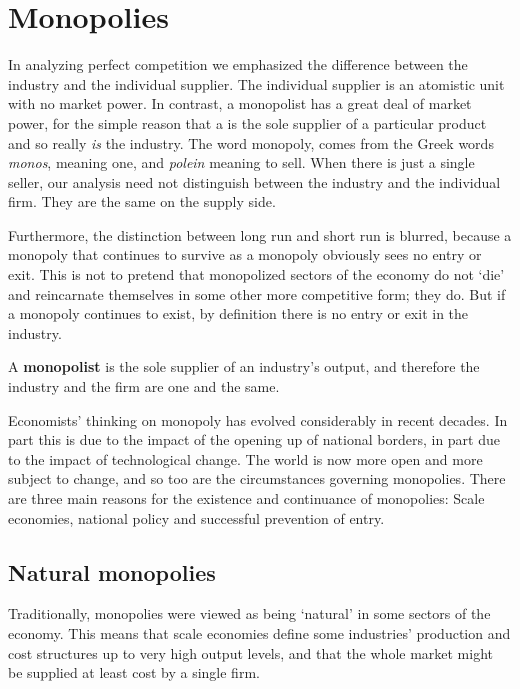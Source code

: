 \section{Monopolies}\label{sec:ch10sec1}

In analyzing perfect competition we emphasized the difference between the
industry and the individual supplier. The individual supplier is an
atomistic unit with no market power. In contrast, a monopolist has a great
deal of market power, for the simple reason that a 
is the sole supplier of a particular product and so really \textit{is} the
industry. The word monopoly, comes from the Greek words \textit{monos},
meaning one, and \textit{polein} meaning to sell. When there is just a
single seller, our analysis need not distinguish between the industry and
the individual firm. They are the same on the supply side.

Furthermore, the distinction between long run and short run is blurred,
because a monopoly that continues to survive as a monopoly obviously sees no
entry or exit. This is not to pretend that monopolized sectors of the
economy do not `die' and reincarnate themselves in some other more
competitive form; they do. But if a monopoly continues to exist, by
definition there is no entry or exit in the industry.

\begin{DefBox}
	A \textbf{monopolist} is the sole supplier of an industry's output, and therefore the industry and the firm are one and the same.
\end{DefBox}

Economists' thinking on monopoly has evolved considerably in recent decades.
In part this is due to the impact of the opening up of national borders, in
part due to the impact of technological change. The world is now more open
and more subject to change, and so too are the circumstances governing
monopolies. There are three main reasons for the existence and continuance
of monopolies: Scale economies, national policy and successful prevention of
entry.

\newhtmlpage

\subsection*{Natural monopolies}

Traditionally, monopolies were viewed as being `natural' in some sectors of
the economy. This means that scale economies define some industries'
production and cost structures up to very high output levels, and that the
whole market might be supplied at least cost by a single firm.

